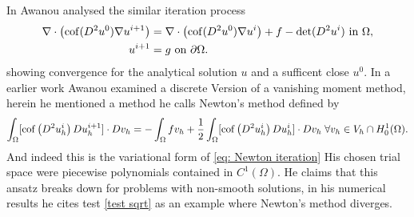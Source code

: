 In \cite{Awanou2014} Awanou analysed the similar iteration process
\begin{align}
	\nabla \cdot \left( \operatorname{cof}(D^2 u^0) \nabla u^{i+1} \right) &= \nabla \cdot \left( \operatorname{cof}(D^2 u^0) \nabla u^{i} \right) + f - \operatorname{det} (D^2u^i) \textnormal{ in } \Omega,  \label{eq: Awanout eq}\\
	u^{i+1} &= g \textnormal{ on } \partial \Omega.
\end{align}
showing convergence for the analytical solution $u$ and a sufficent close $u^0$. 
In a earlier work \cite{Awanou2010} Awanou examined a discrete Version of a vanishing moment method, herein he mentioned a method he calls Newton's method defined by
\[
	\int_{\Omega} [\operatorname{cof} \left(  D^2 u_h^i \right) Du_h^{i+1}] \cdot Dv_h = -	\int_{\Omega} f v_h + \frac 1 2 \int_{\Omega} [\operatorname{cof} \left(  D^2 u_h^i \right) Du_h^{i}] \cdot Dv_h \; \forall v_h \in V_h \cap H^1_0 (\Omega)  \label{eq: Awanout eq2}.
\]
And indeed this is the variational form of \eqref{eq: Newton iteration}
His chosen trial space were piecewise polynomials contained in $C^1(\Omega)$. He claims that this ansatz breaks down for problems with non-smooth solutions, in his numerical results he cites test \ref{test sqrt} as an example where Newton's method diverges.

